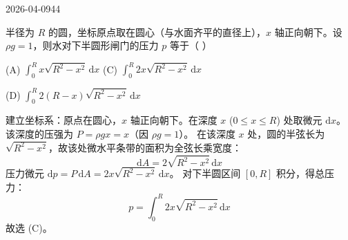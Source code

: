 \begin{mistake}{2026-04-09}{44}

\begin{problemcontent}
半径为 \( R \) 的圆，坐标原点取在圆心（与水面齐平的直径上），\( x \) 轴正向朝下。设 \( \rho g = 1 \)，则水对下半圆形闸门的压力 \( p \) 等于（ ）

(A) \(\displaystyle\int_0^R x\sqrt{R^2 - x^2}\,\mathrm{d}x\) 
(C) \(\displaystyle\int_0^R 2x\sqrt{R^2 - x^2}\,\mathrm{d}x\)

(D) \(\displaystyle\int_0^R 2(R-x)\sqrt{R^2 - x^2}\,\mathrm{d}x\)
\end{problemcontent}

\begin{solutioncontent}
建立坐标系：原点在圆心，\( x \) 轴正向朝下。在深度 \( x \) (\( 0 \leqslant x \leqslant R \)) 处取微元 \( \mathrm{d}x \)。
该深度的压强为 \( P = \rho g x = x \)（因 \(\rho g = 1\)）。
在该深度 \( x \) 处，圆的半弦长为 \( \sqrt{R^2 - x^2} \)，故该处微水平条带的面积为全弦长乘宽度：
\[ \mathrm{d}A = 2\sqrt{R^2 - x^2}\,\mathrm{d}x \]
压力微元 \( \mathrm{d}p = P\,\mathrm{d}A = 2x\sqrt{R^2 - x^2}\,\mathrm{d}x \)。
对下半圆区间 \([0, R]\) 积分，得总压力：
\[ p = \int_0^R 2x\sqrt{R^2 - x^2}\,\mathrm{d}x \]
故选 (C)。
\end{solutioncontent}


\end{mistake}
